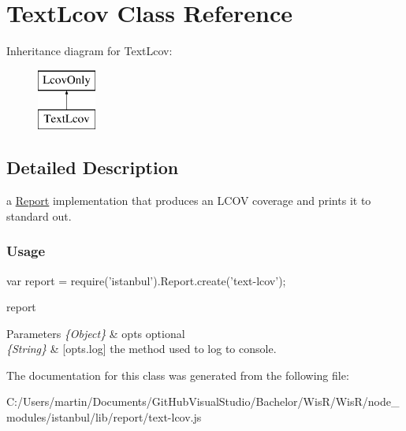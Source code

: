 \hypertarget{class_text_lcov}{}\section{Text\+Lcov Class Reference}
\label{class_text_lcov}
Inheritance diagram for Text\+Lcov\+:\begin{figure}[H]
\begin{center}
\leavevmode
\includegraphics[height=2.000000cm]{class_text_lcov}
\end{center}
\end{figure}


\subsection{Detailed Description}
a {\ttfamily \hyperlink{class_report}{Report}} implementation that produces an L\+C\+O\+V coverage and prints it to standard out.

\subsubsection*{Usage }

\begin{DoxyVerb} var report = require('istanbul').Report.create('text-lcov');
\end{DoxyVerb}


report


\begin{DoxyParams}{Parameters}
{\em \{\+Object\}} & opts optional \\
\hline
{\em \{\+String\}} & \mbox{[}opts.\+log\mbox{]} the method used to log to console. \\
\hline
\end{DoxyParams}


The documentation for this class was generated from the following file\+:\begin{DoxyCompactItemize}
\item 
C\+:/\+Users/martin/\+Documents/\+Git\+Hub\+Visual\+Studio/\+Bachelor/\+Wis\+R/\+Wis\+R/node\+\_\+modules/istanbul/lib/report/text-\/lcov.\+js\end{DoxyCompactItemize}
